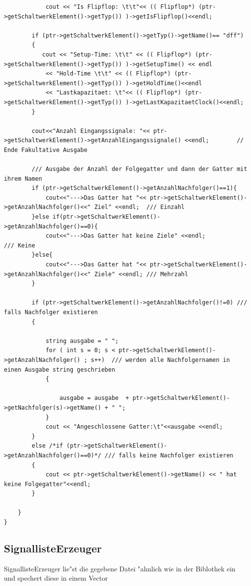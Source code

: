 \documentclass[a4paper,10pt,twoside]{report}
\newcounter{ausgabe}[chapter]
\begin{document}
\begin{lstlisting}
            cout << "Is Flipflop: \t\t"<< (( Flipflop*) (ptr->getSchaltwerkElement()->getTyp()) )->getIsFlipflop()<<endl;

        if (ptr->getSchaltwerkElement()->getTyp()->getName()== "dff")
        {
           cout << "Setup-Time: \t\t" << (( Flipflop*) (ptr->getSchaltwerkElement()->getTyp()) )->getSetupTime() << endl
            << "Hold-Time \t\t" << (( Flipflop*) (ptr->getSchaltwerkElement()->getTyp()) )->getHoldTime()<<endl
            << "Lastkapazitaet: \t"<< (( Flipflop*) (ptr->getSchaltwerkElement()->getTyp()) )->getLastKapazitaetClock()<<endl;
        }

        cout<<"Anzahl Eingangssignale: "<< ptr->getSchaltwerkElement()->getAnzahlEingangssignale() <<endl;        // Ende Fakultative Ausgabe

        /// Ausgabe der Anzahl der Folgegatter und dann der Gatter mit ihrem Namen
        if (ptr->getSchaltwerkElement()->getAnzahlNachfolger()==1){
            cout<<"--->Das Gatter hat "<< ptr->getSchaltwerkElement()->getAnzahlNachfolger()<<" Ziel" <<endl;  /// Einzahl
        }else if(ptr->getSchaltwerkElement()->getAnzahlNachfolger()==0){
            cout<<"--->Das Gatter hat keine Ziele" <<endl;                                                     /// Keine
        }else{
            cout<<"--->Das Gatter hat "<< ptr->getSchaltwerkElement()->getAnzahlNachfolger()<<" Ziele" <<endl; /// Mehrzahl
        }

        if (ptr->getSchaltwerkElement()->getAnzahlNachfolger()!=0) /// falls Nachfolger existieren
        {

            string ausgabe = " ";
            for ( int s = 0; s < ptr->getSchaltwerkElement()->getAnzahlNachfolger() ; s++)  /// werden alle Nachfolgernamen in einen Ausgabe string geschrieben
            {

                ausgabe = ausgabe  + ptr->getSchaltwerkElement()->getNachfolger(s)->getName() + " ";
            }
            cout << "Angeschlossene Gatter:\t"<<ausgabe <<endl;
        }
        else /*if (ptr->getSchaltwerkElement()->getAnzahlNachfolger()==0)*/ /// falls keine Nachfolger existieren
        {
            cout << ptr->getSchaltwerkElement()->getName() << " hat keine Folgegatter"<<endl;
        }

    }
}

\end{lstlisting}

\subsection{SignallisteErzeuger}
SignallisteErzeuger lie"st die gegebene Datei "ahnlich wie in der Biblothek ein und spechert diese in einem Vector
\end{document}
